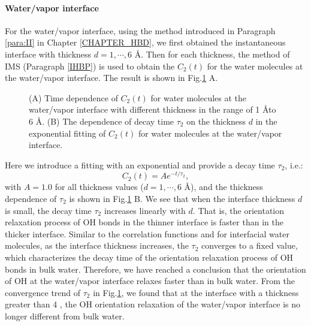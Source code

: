 \paragraph{Water/vapor interface} For the water/vapor interface, using the method introduced in Paragraph \ref{para:II} in Chapter \ref{CHAPTER_HBD}, 
we first obtained the instantaneous interface
with thickness $d=1, \cdots, 6$ \AA. Then for each thickness, the method of IMS (Paragraph \ref{IHBP}) 
is used to obtain the $C_2(t)$ for the water molecules at the water/vapor interface.
The result is shown in Fig.\thinspace\ref{fig:128w_c2_tau2_vs_thickness} A.
\begin{figure}[H]%
    \centering
    \qquad
    \caption{
(A) Time dependence of $C_2(t)$ for water molecules at the water/vapor interface with different thickness in the range of 1 \AA to 6 \AA. 
(B) The dependence of decay time $\tau_2$ on the thickness $d$ in the exponential fitting of $C_2(t)$ for water molecules at the water/vapor interface.
}%
    \label{fig:128w_c2_tau2_vs_thickness}%
\end{figure}

%
Here we introduce a fitting with an exponential and provide a decay time $\tau_2$, i.e.: 
\begin{equation}
C_2(t)=Ae^{-t/\tau_2},
\label{eq:c2_single_exponential}
\end{equation}
with $A= 1.0$ for all thickness values ($d=1,\cdots, 6$ \AA), and the thickness dependence of $\tau_2$ is shown in Fig.\thinspace\ref{fig:128w_c2_tau2_vs_thickness} B.
We see that when the interface thickness $d$ is small, the decay time $\tau_2$ increases linearly with $d$. 
That is, the orientation relaxation process of OH bonds in the thinner interface is faster than in the thicker interface.
Similar to the correlation functions \CHB and \SHB for interfacial water molecules, as the interface thickness increases, the $\tau_2$ converges to a fixed value,
which characterizes the decay time of the orientation relaxation process of OH bonds in bulk water. 
Therefore, we have reached a conclusion that the orientation of OH at the water/vapor interface relaxes faster than in bulk water. 
From the convergence trend of $\tau_2$ in Fig.\thinspace\ref{fig:128w_c2_tau2_vs_thickness}, 
we found that at the interface with a thickness greater than 4 \A, the OH orientation relaxation of the water/vapor interface is no longer different from bulk water. 

